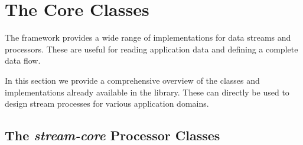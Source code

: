 \section{The \streams Core Classes}
The \streams framework provides a wide range of implementations for
data streams and processors. These are useful for reading application
data and defining a complete data flow.

In this section we provide a comprehensive overview of the classes and
implementations already available in the \streams library. These can
directly be used to design stream processes for various application
domains.



\subsection{The {\em stream-core} Processor Classes}






